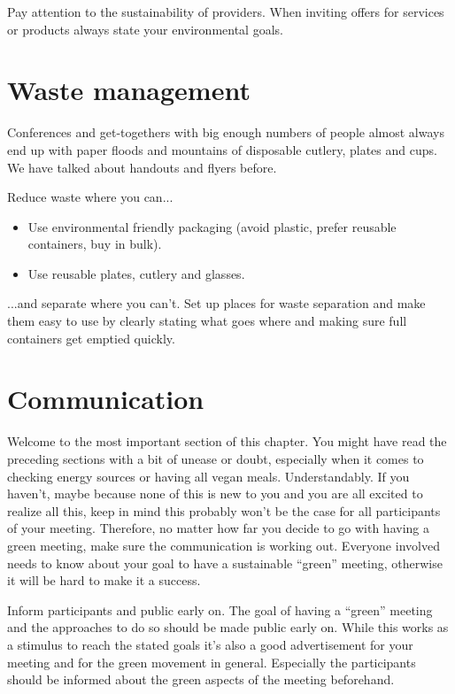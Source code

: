 \begin{suggest}{Pay attention to the sustainability of providers.}
	When inviting offers for services or products always state your environmental goals.
\end{suggest}

\section{Waste management} 
Conferences and get-togethers with big enough numbers of people almost always end up with paper floods and mountains of disposable cutlery, plates and cups. We have talked about handouts and flyers before. 

\begin{suggest}{Reduce waste where you can...}
	\vspace{-2\topsep}
	\begin{itemize}
	\item Use environmental friendly packaging (avoid plastic, prefer reusable containers, buy in bulk).
	\item Use reusable plates, cutlery and glasses.
	\end{itemize}
\end{suggest}

\begin{suggest}{...and separate where you can't.}
	Set up places for waste separation and make them easy to use by clearly stating what goes where and making sure full containers get emptied quickly.
\end{suggest}

\section{Communication}
Welcome to the most important section of this chapter. You might have read the preceding sections with a bit of unease or doubt, especially when it comes to checking energy sources or having all vegan meals. Understandably. If you haven't, maybe because none of this is new to you and you are all excited to realize all this, keep in mind this probably won't be the case for all participants of your meeting. Therefore, no matter how far you decide to go with having a green meeting, make sure the communication is working out. Everyone involved needs to know about your goal to have a sustainable ``green'' meeting, otherwise it will be hard to make it a success.

\begin{suggest}{Inform participants and public early on.}
	The goal of having a ``green'' meeting and the approaches to do so should be made public early on. While this works as a stimulus to reach the stated goals it's also a good advertisement for your meeting and for the green movement in general. Especially the participants should be informed about the green aspects of the meeting beforehand.
\end{suggest}

